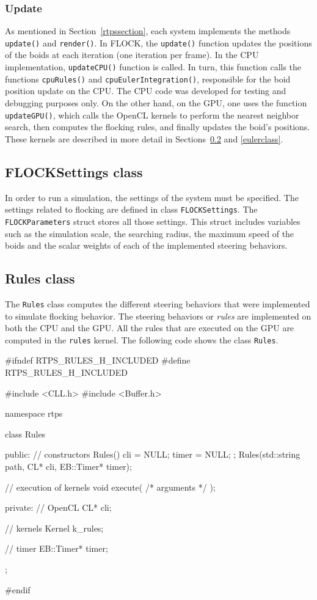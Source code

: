 \subsubsection{Update}
As mentioned in Section~\ref{rtpssection}, each system implements the methods \texttt{update()} and \texttt{render()}. In FLOCK, the \texttt{update()} function updates the positions of the boids at each iteration (one iteration per frame). In the CPU implementation, \texttt{updateCPU()} function is called. In turn, this function calls the functions \texttt{cpuRules()} and \texttt{cpuEulerIntegration()}, responsible for the boid position update on the CPU. The CPU code was developed for testing and debugging purposes only. On the other hand, on the GPU, one uses the function \texttt{updateGPU()}, which calls the OpenCL kernels to perform the nearest neighbor search, then computes the flocking rules, and finally updates the boid's positions. These kernels are described in more detail in Sections~\ref{rulesclass} and \ref{eulerclass}.

\subsection{FLOCKSettings class}
In order to run a simulation, the settings of the system must be specified. The settings related to flocking are defined in class \texttt{FLOCKSettings}. The \texttt{FLOCKParameters} struct stores all those settings. This struct includes variables such as the simulation scale, the searching radius, the maximum speed of the boids and the scalar weights of each of the implemented steering behaviors. 

\subsection{Rules class}\label{rulesclass}
The \texttt{Rules} class computes the different steering behaviors that were implemented to simulate flocking behavior. The steering behaviors or \textit{rules} are implemented on both the CPU and the GPU. All the rules that are executed on the GPU are computed in the \texttt{rules} kernel. The following code shows the class \texttt{Rules}.

\begin{cppcode}{0}
#ifndef RTPS_RULES_H_INCLUDED
#define RTPS_RULES_H_INCLUDED

#include <CLL.h>
 #include <Buffer.h>

namespace rtps
 {
	class Rules
	{
		public:
			// constructors
			Rules() { cli = NULL; timer = NULL; };
			Rules(std::string path, CL* cli, EB::Timer* timer);
			
			// execution of kernels
			void execute( /* arguments */ );
			
		private:
			// OpenCL
			CL* cli;
			
			// kernels
			Kernel k_rules;
			
			// timer
			EB::Timer* timer;
	};
}
#endif
\end{cppcode}
\vspace{16pt}

